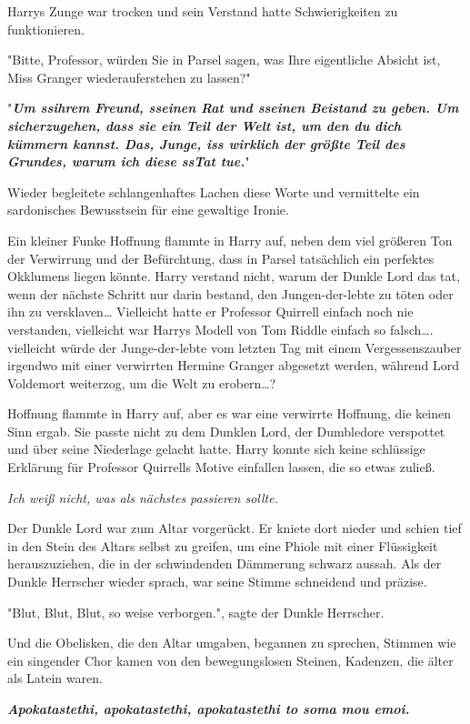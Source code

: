 {Harrys Zunge war trocken und sein Verstand hatte Schwierigkeiten zu funktionieren.

"Bitte, Professor, würden Sie in Parsel sagen, was Ihre eigentliche Absicht ist, Miss Granger wiederauferstehen zu lassen?"

"\textbf{\emph{Um ssihrem Freund, sseinen Rat und sseinen Beistand zu geben. Um sicherzugehen, dass sie ein Teil der Welt ist, um den du dich kümmern kannst. Das, Junge, iss wirklich der größte Teil des Grundes, warum ich diese ssTat tue.}}"

Wieder begleitete schlangenhaftes Lachen diese Worte und vermittelte ein sardonisches Bewusstsein für eine gewaltige Ironie.

Ein kleiner Funke Hoffnung flammte in Harry auf, neben dem viel größeren Ton der Verwirrung und der Befürchtung, dass in Parsel tatsächlich ein perfektes Okklumens liegen könnte. Harry verstand nicht, warum der Dunkle Lord das tat, wenn der nächste Schritt nur darin bestand, den Jungen-der-lebte zu töten oder ihn zu versklaven… Vielleicht hatte er Professor Quirrell einfach noch nie verstanden, vielleicht war Harrys Modell von Tom Riddle einfach so falsch…. vielleicht würde der Junge-der-lebte vom letzten Tag mit einem Vergessenszauber irgendwo mit einer verwirrten Hermine Granger abgesetzt werden, während Lord Voldemort weiterzog, um die Welt zu erobern…?

Hoffnung flammte in Harry auf, aber es war eine verwirrte Hoffnung, die keinen Sinn ergab. Sie passte nicht zu dem Dunklen Lord, der Dumbledore verspottet und über seine Niederlage gelacht hatte. Harry konnte sich keine schlüssige Erklärung für Professor Quirrells Motive einfallen lassen, die so etwas zuließ.

\emph{Ich weiß nicht, was als nächstes passieren sollte.}

Der Dunkle Lord war zum Altar vorgerückt. Er kniete dort nieder und schien tief in den Stein des Altars selbst zu greifen, um eine Phiole mit einer Flüssigkeit herauszuziehen, die in der schwindenden Dämmerung schwarz aussah. Als der Dunkle Herrscher wieder sprach, war seine Stimme schneidend und präzise.

"Blut, Blut, Blut, so weise verborgen.", sagte der Dunkle Herrscher.

Und die Obelisken, die den Altar umgaben, begannen zu sprechen, Stimmen wie ein singender Chor kamen von den bewegungslosen Steinen, Kadenzen, die älter als Latein waren.

\textbf{\emph{\hfill\break Apokatastethi, apokatastethi, apokatastethi to soma mou emoi.}}

}
